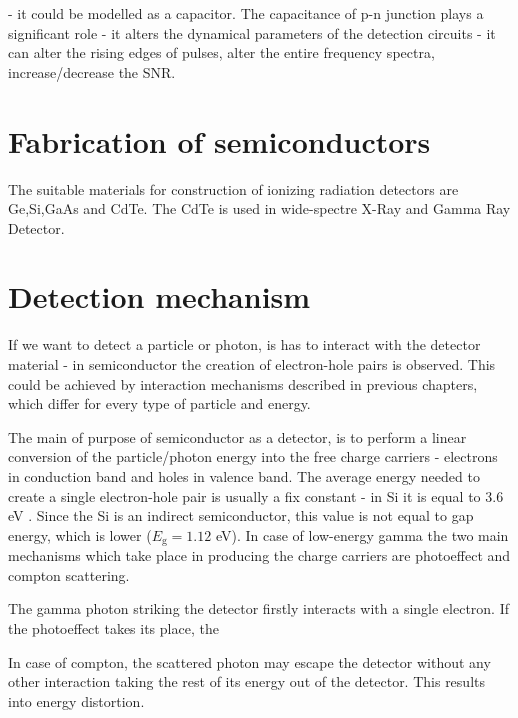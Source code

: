 {- it could be modelled as a capacitor. The capacitance of p-n junction plays a significant role - it alters the dynamical parameters of the detection circuits - it can alter the rising edges of pulses, alter the entire frequency spectra, increase/decrease the SNR.

\section{Fabrication of semiconductors}



The suitable materials for construction of ionizing radiation detectors are Ge,Si,GaAs and CdTe. The CdTe is used in wide-spectre X-Ray and Gamma Ray Detector.

\section{Detection mechanism}

\par
If we want to detect a particle or photon, is has to interact with the detector material - in semiconductor the creation of electron-hole pairs is observed. This could be achieved by interaction mechanisms described in previous chapters, which differ for every type of particle and energy. 

\par
The main of purpose of semiconductor as a detector, is to perform a linear conversion of the particle/photon energy into the free charge carriers - electrons in conduction band and holes in valence band. The average energy needed to create a single electron-hole pair is usually a fix constant - in Si it is equal to 3.6 eV \cite{Lutz_2007}. Since the Si is an indirect semiconductor, this value is not equal to gap energy, which is lower ($E_{\textrm{g}} = 1.12$ eV). In case of low-energy gamma the two main mechanisms which take place in producing the charge carriers are photoeffect and compton scattering. 

\par
The gamma photon striking the detector firstly interacts with a single electron. If the photoeffect takes its place, the






 In case of compton, the scattered photon may escape the detector without any other interaction taking the rest of its energy out of the detector. This results into energy distortion.  

}
